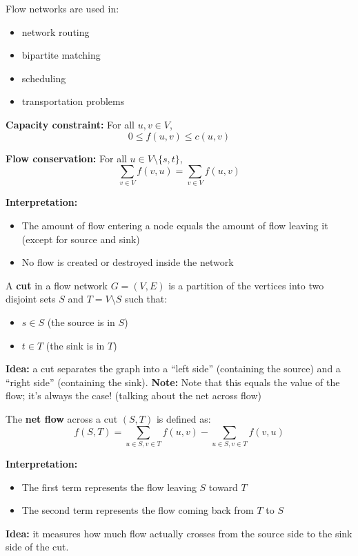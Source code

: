 \documentclass[11pt,a4paper,openany]{book}
\begin{document}
\begin{defnbox}[title=Applications]
Flow networks are used in:
\begin{itemize}
    \item network routing
    \item bipartite matching
    \item scheduling
    \item transportation problems
\end{itemize}
\end{defnbox}


\begin{defnbox}[title=Flow Constraints]

\textbf{Capacity constraint:} For all $u, v \in V$,
\[
0 \le f(u,v) \le c(u,v)
\]

\textbf{Flow conservation:} For all $u \in V \setminus \{s,t\}$,
\[
\sum_{v \in V} f(v,u) = \sum_{v \in V} f(u,v)
\]

\textbf{Interpretation:}
\begin{itemize}
    \item The amount of flow entering a node equals the amount of flow leaving it (except for source and sink)
    \item No flow is created or destroyed inside the network
\end{itemize}

\end{defnbox}



\begin{defnbox}[title=Cut in Flow Networks]
A \textbf{cut} in a flow network $G = (V, E)$ is a partition of the vertices into two disjoint sets $S$ and $T = V \setminus S$ such that:
\begin{itemize}
    \item $s \in S$ (the source is in $S$)
    \item $t \in T$ (the sink is in $T$)
\end{itemize}

\textbf{Idea:} a cut separates the graph into a “left side” (containing the source) and a “right side” (containing the sink).
\textbf{Note:} Note that this equals the value of the flow; it's always the case! (talking about the net across flow)
\begin{defnbox}[title=Net Flow Across a Cut]
The \textbf{net flow} across a cut $(S, T)$ is defined as:
\[
f(S,T) = \sum_{u \in S, v \in T} f(u,v) - \sum_{u \in S, v \in T} f(v,u)
\]

\textbf{Interpretation:}
\begin{itemize}
    \item The first term represents the flow leaving $S$ toward $T$
    \item The second term represents the flow coming back from $T$ to $S$
\end{itemize}

\textbf{Idea:} it measures how much flow actually crosses from the source side to the sink side of the cut.
\end{defnbox}



\end{defnbox}
\end{document}
